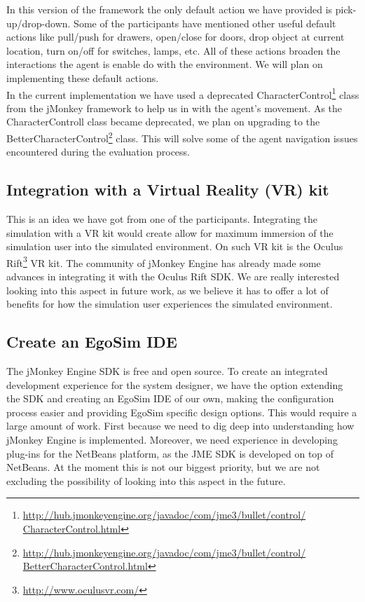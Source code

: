 In this version of the framework the only default action we have provided is pick-up/drop-down. Some of the participants have mentioned other useful default actions like pull/push for drawers, open/close for doors, drop object at current location, turn on/off for switches, lamps, etc. All of these actions broaden the interactions the agent is enable do with the environment. We will plan on implementing these default actions.\\

In the current implementation we have used a deprecated CharacterControl\footnote{\url{http://hub.jmonkeyengine.org/javadoc/com/jme3/bullet/control/
CharacterControl.html}} class from the jMonkey framework to help us in with the agent's movement. As the CharacterControll class became deprecated, we plan on upgrading to the BetterCharacterControl\footnote{\url{http://hub.jmonkeyengine.org/javadoc/com/jme3/bullet/control/
BetterCharacterControl.html}} class. This will solve some of the agent navigation issues encountered during the evaluation process.

\subsection{Integration with a Virtual Reality (VR) kit}
This is an idea we have got from one of the participants. Integrating the simulation with a VR kit would create allow for maximum immersion of the simulation user into the simulated environment. On such VR kit is the Oculus Rift\footnote{\url{http://www.oculusvr.com/}} VR kit. The community of jMonkey Engine has already made some advances in integrating it with the Oculus Rift SDK. We are really interested looking into this aspect in future work, as we believe it has to offer a lot of benefits for how the simulation user experiences the simulated environment.

\subsection{Create an EgoSim IDE}
The jMonkey Engine SDK is free and open source. To create an integrated development experience for the system designer, we have the option extending the SDK and creating an EgoSim IDE of our own, making the configuration process easier and providing EgoSim specific design options. This would require a large amount of work. First because we need to dig deep into understanding how jMonkey Engine is implemented. Moreover, we need experience in developing plug-ins for the NetBeans platform, as the JME SDK is developed on top of NetBeans. At the moment this is not our biggest priority, but we are not excluding the possibility of looking into this aspect in the future.
